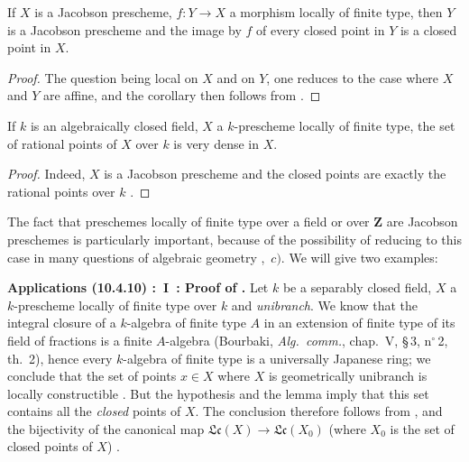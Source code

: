 \begin{corollary}[10.4.7]
\label{IV.10.4.7}
If $X$ is a Jacobson prescheme, $f:Y\to X$ a morphism locally of finite type, then $Y$ is a Jacobson prescheme and the image by $f$ of every closed point in $Y$ is a closed point in $X$.
\end{corollary}

\begin{proof}
The question being local on $X$ and on $Y$, one reduces to the case where $X$ and $Y$ are affine, and the corollary then follows from .
\end{proof}

\begin{corollary}[10.4.8]
\label{IV.10.4.8}
If $k$ is an algebraically closed field, $X$ a $k$-prescheme locally of finite type, the set of rational points of $X$ over $k$ is very dense in $X$.
\end{corollary}

\begin{proof}
Indeed, $X$ is a Jacobson prescheme  and the closed points are exactly the rational points over $k$ .
\end{proof}

\begin{env}[10.4.9]
\label{IV.10.4.9}
The fact that preschemes locally of finite type over a field or over $\mathbf{Z}$ are Jacobson preschemes is particularly important, because of the possibility of reducing to this case in many questions of algebraic geometry ,~$c)$.
We will give two examples:
\end{env}

\begin{env}[10.4.10]
\label{IV.10.4.10}
\textbf{Applications (10.4.10) :~I~: Proof of .}
Let $k$ be a separably closed field, $X$ a $k$-prescheme locally of finite type over $k$ and \emph{unibranch}.
We know that the integral closure of a $k$-algebra of finite type $A$ in an extension of finite type of its field of fractions is a finite $A$-algebra (Bourbaki, \emph{Alg.\ comm.}, chap.~V, \S\,3, n$^\circ$\,2, th.~2), hence every $k$-algebra of finite type is a universally Japanese ring; we conclude that the set of points $x\in X$ where $X$ is geometrically unibranch is locally constructible .
But the hypothesis and the lemma  imply that this set contains all the \emph{closed} points of $X$.
The conclusion therefore follows from ,  and the bijectivity of the canonical map $\mathfrak{Lc}(X)\to\mathfrak{Lc}(X_0)$ (where $X_0$ is the set of closed points of $X$) .
\end{env}

